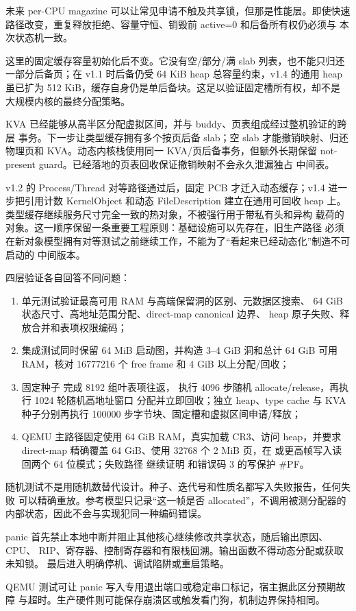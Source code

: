 未来 per-CPU magazine 可以让常见申请不触及共享锁，但那是性能层。即使快速
路径改变，重复释放拒绝、容量守恒、销毁前 active=0 和后备所有权仍必须与
本次状态机一致。

这里的固定缓存容量初始化后不变。它没有空/部分/满 slab 列表，也不能只归还
一部分后备页；在 v1.1 时后备仍受 64 KiB heap 总容量约束，v1.4 的通用 heap
虽已扩为 512 KiB，缓存自身仍是单后备块。这足以验证固定槽所有权，却不是
大规模内核的最终分配策略。

KVA 已经能够从高半区分配虚拟区间，并与 buddy、页表组成经过整机验证的跨层
事务。下一步让类型缓存拥有多个按页后备 slab；空 slab 才能撤销映射、归还
物理页和 KVA。动态内核栈使用同一 KVA/页后备事务，但额外长期保留
not-present guard。已经落地的页表回收保证撤销映射不会永久泄漏独占
中间表。

v1.2 的 Process/Thread 对等路径通过后，固定 PCB 才迁入动态缓存；v1.4
进一步把引用计数 KernelObject 和动态 FileDescription 建立在通用可回收
heap 上。类型缓存继续服务尺寸完全一致的热对象，不被强行用于带私有头和异构
载荷的对象。这一顺序保留一条重要工程原则：基础设施可以先存在，旧生产路径
必须在新对象模型拥有对等测试之前继续工作，不能为了“看起来已经动态化”制造不可启动的
中间版本。

四层验证各自回答不同问题：

\begin{enumerate}[label=\arabic*.]
  \item 单元测试验证最高可用 RAM 与高端保留洞的区别、元数据区搜索、
        64 GiB 状态尺寸、高地址范围分配、direct-map canonical 边界、
        heap 原子失败、释放合并和表项权限编码；
  \item 集成测试同时保留 64 MiB 启动图，并构造 3--4 GiB 洞和总计 64 GiB
        可用 RAM，核对 16777216 个 free frame 和 4 GiB 以上分配/回收；
  \item 固定种子  完成 8192 组叶表项往返，
        执行 4096 步随机 allocate/release，再执行 1024 轮随机高地址窗口
        分配并立即回收；独立 heap、type cache 与 KVA 种子分别再执行
        100000 步字节块、固定槽和虚拟区间申请/释放；
  \item QEMU 主路径固定使用 64 GiB RAM，真实加载 CR3、访问 heap，并要求
        direct-map 精确覆盖 64 GiB、使用 32768 个 2 MiB 页，在
         或更高帧写入读回两个 64 位模式；失败路径
        继续证明  和错误码 3 的写保护 \#PF。
\end{enumerate}

随机测试不是用随机数替代设计。种子、迭代号和性质名都写入失败报告，任何失败
可以精确重放。参考模型只记录“这一帧是否 allocated”，不调用被测分配器的
内部状态，因此不会与实现犯同一种编码错误。

panic 首先禁止本地中断并阻止其他核心继续修改共享状态，随后输出原因、CPU、
RIP、寄存器、控制寄存器和有限栈回溯。输出函数不得动态分配或获取未知锁。
最后进入明确停机、调试陷阱或重启策略。

QEMU 测试可让 panic 写入专用退出端口或稳定串口标记，宿主据此区分预期故障
与超时。生产硬件则可能保存崩溃区或触发看门狗，机制边界保持相同。

